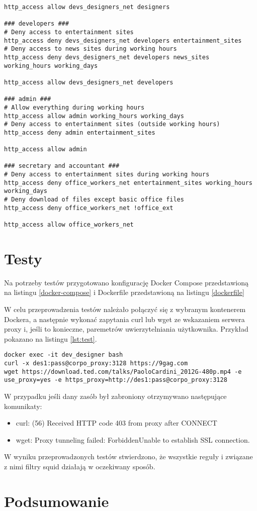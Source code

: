 \documentclass{article}
\begin{document}
\begin{lstlisting}[caption=Zmiany w pliku squid.conf \label{lst:squid-conf}]
http_access allow devs_designers_net designers

### developers ###
# Deny access to entertainment sites
http_access deny devs_designers_net developers entertainment_sites
# Deny access to news sites during working hours
http_access deny devs_designers_net developers news_sites working_hours working_days

http_access allow devs_designers_net developers

### admin ###
# Allow everything during working hours
http_access allow admin working_hours working_days
# Deny access to entertainment sites (outside working hours)
http_access deny admin entertainment_sites

http_access allow admin

### secretary and accountant ###
# Deny access to entertainment sites during working hours
http_access deny office_workers_net entertainment_sites working_hours working_days
# Deny download of files except basic office files
http_access deny office_workers_net !office_ext

http_access allow office_workers_net
\end{lstlisting}

\section{Testy}
Na potrzeby testów przygotowano konfigurację Docker Compose przedstawioną na listingu \ref{docker-compose} i Dockerfile przedstawioną na listingu \ref{dockerfile}





W celu przeprowadzenia testów należało połączyć się z wybranym kontenerem Dockera, a następnie wykonać zapytania curl lub wget ze wskazaniem serwera proxy i, jeśli to konieczne, paremetrów uwierzytelniania użytkownika.
Przykład pokazano na listingu \ref{lst:test}.

\begin{lstlisting}[caption=Przykładowy test \label{lst:test}]
docker exec -it dev_designer bash
curl -x des1:pass@corpo_proxy:3128 https://9gag.com
wget https://download.ted.com/talks/PaoloCardini_2012G-480p.mp4 -e use_proxy=yes -e https_proxy=http://des1:pass@corpo_proxy:3128
\end{lstlisting}

W przypadku jeśli dany zasób był zabroniony otrzymywano następujące komunikaty:
\begin{itemize}
    \item curl: (56) Received HTTP code 403 from proxy after CONNECT
    \item wget: Proxy tunneling failed: ForbiddenUnable to establish SSL connection.
\end{itemize}

W wyniku przeprowadzonych testów stwierdzono, że wszystkie reguły i związane z nimi filtry squid działają w oczekiwany sposób.

\section{Podsumowanie}
\end{document}
